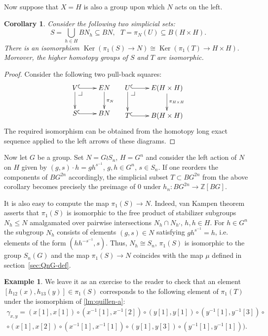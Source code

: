 \documentclass[oneside, 12pt]{amsart}
\makeatletter
\theoremstyle{plain}
\numberwithin{equation}{section}
\numberwithin{lemma}{section}
\newtheorem{cor}[lemma]{Corollary}
\theoremstyle{remark}
\theoremstyle{definition}
\newtheorem{example}[lemma]{Example} \Crefname{example}{Example}{Examples}
\DeclareMathOperator{\Ker}{Ker}
\newcommand{\ZZ}{\mathbb{Z}}
\newcommand{\pullbackcorner}[1][dr]{\save*!/#1-1.2pc/#1:(-1,1)@^{|-}\restore}
\makeatother
\begin{document}
Now suppose that $X=H$ is also a group upon which $N$ acts on the left.
\begin{cor} \label{cor:ker-iso}
Consider the following two simplicial sets:
\[ S = \bigcup\limits_{h\in H} BN_h \subseteq BN,\ \ \ T = \pi_N(U) \subseteq B(H \times H).\]
There is an isomorphism $\Ker(\pi_1(S) \to N) \cong \Ker(\pi_1(T) \to H \times H).$
Moreover, the higher homotopy groups of $S$ and $T$ are isomorphic. \end{cor}
\begin{proof}
Consider the following two pull-back squares:
\[ \xymatrix{ V  \ar@{^{(}->}[r] \ar[d] \pullbackcorner & \ar[d]^{\pi_N} EN \\
              S \ar@{^{(}->}[r] & BN } \ \ \ 
   \xymatrix{ U  \ar@{^{(}->}[r] \ar[d] \pullbackcorner & \ar[d]^{\pi_{H \times H}} E(H \times H) \\
              T \ar@{^{(}->}[r] & B(H \times H)}\] 
The required isomorphism can be obtained from the homotopy long exact sequence applied to the left arrows of these diagrams.\end{proof}

Now let $G$ be a group. Set $N = G \wr S_n$, $H = G^n$ and consider the left action of $N$ on $H$ given by $(g, s) \cdot h = gh^{s^{-1}}$, $g, h\in G^n$, $s\in S_n$.
If one reorders the components of $BG^{2n}$ accordingly, the simplicial subset $T \subset BG^{2n}$ from the above corollary
 becomes precisely the preimage of $0$ under $h_n \colon BG^{2n} \to \ZZ[BG]$.

It is also easy to compute the map $\pi_1(S) \to N$. Indeed, van Kampen theorem~\cite[Theorem~2.7]{May99} asserts that
$\pi_1(S)$ is isomorphic to the free product of stabilizer subgroups $N_{h} \leq N$ amalgamated over pairwise intersections $N_h \cap N_{h'}$, $h, h\in H$.
For $h \in G^n$ the subgroup $N_h$ consists of elements $(g, s) \in N$ satisfying $gh^{s^{-1}} = h$, i.e. elements of the form $(hh^{-s^{-1}}, s)$.
Thus, $N_h\cong S_n$, $\pi_1(S)$ is isomorphic to the group $S_n(G)$ and the map $\pi_1(S) \to N$ coincides with the map $\mu$ defined in section~\ref{sec:QnG-def}.

\begin{example} \label{ex44}
 We leave it as an exercise to the reader to check that an element $[h_{12}(x), h_{13}(y)] \in \pi_1(S)$ corresponds to the following element of $\pi_1(T)$
  under the isomorphism of \cref{lm:quillen-a}:
 \begin{multline} \label{eq:pathT}
  \gamma_{x,y} = (x[1], x[1]) \circ (x^{-1}[1], x^{-1}[2]) \circ (y[1], y[1]) \circ (y^{-1}[1], y^{-1}[3]) \circ \\ \circ (x[1], x[2]) \circ (x^{-1}[1], x^{-1}[1]) \circ (y[1], y[3]) \circ (y^{-1}[1], y^{-1}[1])).
 \end{multline}  
\end{example}
\end{document}
